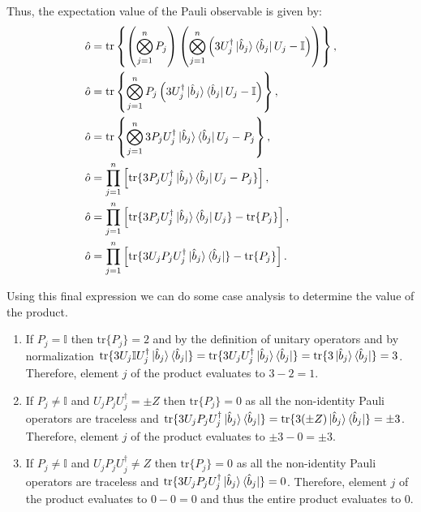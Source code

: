 \documentclass[12pt]{article}
\begin{document}
    Thus, the expectation value of the Pauli observable is given by:
    \begin{align*}
        \hat{o} &= \text{tr}\left\{\left( \bigotimes_{j=1}^n P_j \right) \left( \bigotimes^n_{j=1}\left(3U_j^\dagger\ket{\hat{b}_j}\bra{\hat{b}_j}U_j - \mathbb{I} \right) \right)\right\},\\
        \hat{o} &= \text{tr}\left\{ \bigotimes_{j=1}^n P_j  \left(3U_j^\dagger\ket{\hat{b}_j}\bra{\hat{b}_j}U_j - \mathbb{I} \right) \right\},\\
        \hat{o} &= \text{tr}\left\{ \bigotimes_{j=1}^n 3P_jU_j^\dagger\ket{\hat{b}_j}\bra{\hat{b}_j}U_j - P_j  \right\},\\
        \hat{o} &= \prod_{j=1}^n \left[ \text{tr}\{ 3 P_j U^\dagger_j \ket{\hat{b}_j}\bra{\hat{b}_j}U_j -  P_j \} \right],\\
        \hat{o} &= \prod_{j=1}^n \left[ \text{tr}\{ 3 P_j U^\dagger_j \ket{\hat{b}_j}\bra{\hat{b}_j}U_j\} - \text{tr}\{ P_j \} \right],\\
        \hat{o} &= \prod_{j=1}^n \left[ \text{tr}\{ 3 U_jP_j U^\dagger_j \ket{\hat{b}_j}\bra{\hat{b}_j}\} - \text{tr}\{ P_j \} \right].
    \end{align*}

    Using this final expression we can do some case analysis to determine the value of the product. 
    \begin{enumerate}
        \item If $P_j = \mathbb{I}$ then $\text{tr}\{ P_j \} = 2$ and by the definition of unitary operators and by normalization  $\text{tr}\{ 3 U_j \mathbb{I} U^\dagger_j \ket{\hat{b}_j}\bra{\hat{b}_j}\} = \text{tr}\{ 3 U_j U^\dagger_j \ket{\hat{b}_j}\bra{\hat{b}_j}\} = \text{tr}\{ 3 \ket{\hat{b}_j}\bra{\hat{b}_j}\} = 3$. Therefore, element $j$ of the product evaluates to $3 - 2 = 1$.
        \item If $P_j \neq \mathbb{I}$ and $U_jP_j U^\dagger_j = \pm Z$ then $\text{tr}\{ P_j \} = 0$ as all the non-identity Pauli operators are traceless and $\text{tr}\{ 3 U_jP_j U^\dagger_j \ket{\hat{b}_j}\bra{\hat{b}_j}\} = \text{tr}\{ 3 (\pm Z) \ket{\hat{b}_j}\bra{\hat{b}_j}\} = \pm 3$. Therefore, element $j$ of the product evaluates to $\pm 3 - 0 = \pm 3$.
        \item If $P_j \neq \mathbb{I}$ and $U_jP_j U^\dagger_j \neq Z$ then $\text{tr}\{ P_j \} = 0$ as all the non-identity Pauli operators are traceless and $\text{tr}\{ 3 U_jP_j U^\dagger_j \ket{\hat{b}_j}\bra{\hat{b}_j}\} = 0$. Therefore, element $j$ of the product evaluates to $0 - 0 = 0$ and thus the entire product evaluates to 0.
    \end{enumerate}
\end{document}
